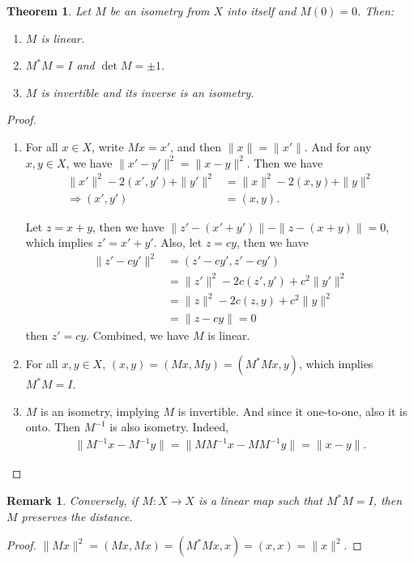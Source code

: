 \documentclass[11pt]{book}
\newtheorem{theorem}{Theorem}[section]
\newtheorem{remark}{Remark}[section]
\theoremstyle{definition}
\numberwithin{equation}{chapter}
\begin{document}
\begin{theorem}\label{isometry_properties}
Let $M$ be an isometry from $X$ into itself and $M(0) = 0$. Then:
\begin{enumerate}[label=(\alph*)]
    \item $M$ is linear.
    \item $M^* M = I$ and $\det M = \pm 1$.
    \item $M$ is invertible and its inverse is an isometry.
\end{enumerate}
\end{theorem}
\begin{proof}
~\begin{enumerate}[label=(\alph*)]
    \item For all $x\in X$, write $Mx = x'$, and then $\|x\| = \|x'\|$. And for any $x,y\in X$, we have $\|x' - y'\|^2 = \|x - y\|^2$. Then we have
    \begin{align*}
        \|x'\|^2 - 2(x', y') + \|y'\|^2 & = \|x\|^2 - 2(x, y) + \|y\|^2 \\
        \Rightarrow (x', y') & = (x, y).
    \end{align*}
    
    Let $z = x + y$, then we have $\|z'-(x'+y')\| - \|z-(x+y)\| = 0$, which implies $z' = x' + y'$. Also, let $z = cy$, then we have
    \begin{align*}
        \|z' - cy'\|^2 & = (z' - cy', z' - cy') \\
        & = \|z'\|^2 - 2c (z', y') + c^2 \|y'\|^2 \\
        & = \|z\|^2 - 2c (z, y) + c^2 \|y\|^2 \\
        & = \|z - cy\| = 0
    \end{align*}
    then $z' = cy$. Combined, we have $M$ is linear.
    \item For all $x,y\in X$, $(x,y) = (Mx, My) = (M^* M x, y)$, which implies $M^* M = I$.
    \item $M$ is an isometry, implying $M$ is invertible. And since it one-to-one, also it is onto. Then $M^{-1}$ is also isometry. Indeed, 
    \begin{align*}
        \|M^{-1}x - M^{-1}y\| = \|M M^{-1}x - M M^{-1}y\| = \|x - y\|.
    \end{align*}
\end{enumerate}
\end{proof}

\begin{remark}
Conversely, if $M:X\to X$ is a linear map such that $M^* M = I$, then $M$ preserves the distance.
\end{remark}
\begin{proof}
$\|Mx\|^2 = (Mx, Mx) = (M^* M x, x) = (x, x) = \|x\|^2$.
\end{proof}
\end{document}

